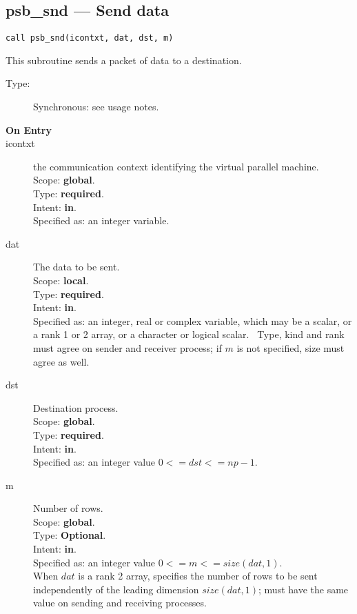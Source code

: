 \clearpage\subsection*{psb\_snd --- Send data}

\begin{verbatim}
call psb_snd(icontxt, dat, dst, m)
\end{verbatim}

This subroutine sends a packet of data to a destination.
\begin{description}
\item[Type:] Synchronous: see usage notes. 
\item[\bf  On Entry ]
\item[icontxt] the communication context identifying the virtual
  parallel machine.\\
Scope: {\bf global}.\\
Type: {\bf required}.\\
Intent: {\bf in}.\\
Specified as: an integer variable.
\item[dat] The data to be sent.\\
Scope: {\bf local}.\\
Type: {\bf required}.\\
Intent: {\bf in}.\\
Specified as: an integer, real or complex variable, which may be a
scalar, or a rank 1 or 2 array, or a character or logical scalar. \
Type, kind and  rank must agree on sender and receiver process; if $m$ is
not specified, size must agree as well. 
\item[dst] Destination process.\\
Scope: {\bf global}.\\
Type: {\bf required}.\\
Intent: {\bf in}.\\
Specified as: an integer value $0<= dst <= np-1$. \\
\item[m] Number of rows.\\
Scope: {\bf global}.\\
Type: {\bf Optional}.\\
Intent: {\bf in}.\\
Specified as: an integer value $0<= m <= size(dat,1)$. \\
When $dat$ is a rank 2 array, specifies the number of rows to be sent
independently of the leading dimension $size(dat,1)$; must have the
same value on sending and receiving processes.
\end{description}


